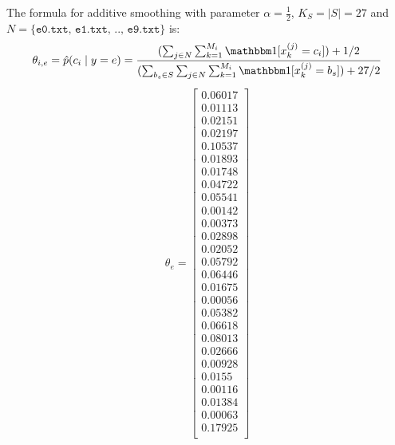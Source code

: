\documentclass[a4paper]{article}
\theoremstyle{definition}
\def\ind{\mathbbm 1}
\newenvironment{soln}{
    \leavevmode\color{blue}\ignorespaces
}{}
\begin{document}
\begin{enumerate}
\begin{soln}
    The formula for additive smoothing with parameter $\alpha=\frac{1}{2}$,  $K_S=|S|=27$ and \\
    $N=\{\texttt{e0.txt, e1.txt, .., e9.txt}\}$ is:
    $$
    \theta_{i,e} = \hat p(c_i \mid y=e) = \frac{(\sum_{j\in N}\sum_{k = 1}^{M_i}\ind [x_{k}^{(j)} = c_i]) + 1/2}{(\sum_{b_s \in S}\sum_{j\in N}\sum_{k = 1}^{M_i}\ind [x_{k}^{(j)} = b_s]) + 27/2}\\
    $$
    \begin{gather*}
        \theta_{e} =    \begin{bmatrix}
                            0.06017 \\
                            0.01113 \\
                            0.02151 \\
                            0.02197 \\
                            0.10537 \\
                            0.01893 \\
                            0.01748 \\
                            0.04722 \\
                            0.05541 \\
                            0.00142 \\
                            0.00373 \\
                            0.02898 \\
                            0.02052 \\
                            0.05792 \\
                            0.06446 \\
                            0.01675 \\
                            0.00056 \\
                            0.05382 \\
                            0.06618 \\
                            0.08013 \\
                            0.02666 \\
                            0.00928 \\
                            0.0155 \\
                            0.00116 \\
                            0.01384 \\
                            0.00063 \\
                            0.17925 \\
                        \end{bmatrix}
    \end{gather*}
\end{soln}


\end{enumerate}
\end{document}
